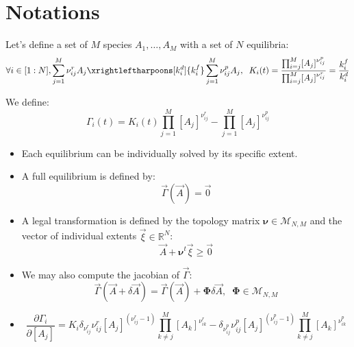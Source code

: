 \documentclass[aps,onecolumn,11pt]{revtex4}
\begin{document}

\section{Notations}

Let's define a set of $M$ species $A_1,\ldots,A_M$ with a set of $N$ equilibria:
\begin{equation}
	\forall i\in[1:N], \sum_{j=1}^M \nu_{ij}^r A_j \xrightleftharpoons[k^d_i]{k^f_i} \sum_{j=1}^{M} \nu_{ij}^p A_j, 
	\;\; K_i(t) = \dfrac{\prod_{i=j}^M [A_j]^{\nu^p_{ij}}}{\prod_{i=j}^M [A_j]^{\nu^r_{ij}}} = \dfrac{k^f_i}{k^d_i}
\end{equation}

We define:
\begin{equation}
	\Gamma_i(t) = K_i(t) \prod_{j=1}^M [A_j]^{\nu^r_{ij}} - \prod_{j=1}^M [A_j]^{\nu^p_{ij}}
\end{equation}

\begin{itemize}
\item Each equilibrium can be individually solved by its specific extent.

\item A full equilibrium is defined by:
\begin{equation}
	\vec{\Gamma}(\vec{A}) = \vec{0}
\end{equation}

\item A legal transformation is defined by the topology matrix $\bm{\nu} \in \mathcal{M}_{N,M}$ 
and the vector of individual extents $\vec{\xi} \in \mathbb{R}^N$:
\begin{equation}
	\vec{A} + \bm{\nu}^t \vec{\xi}  \geq \vec{0}
\end{equation}

\item
We may also compute the jacobian of $\vec{\Gamma}$:
\begin{equation}
	\vec{\Gamma}(\vec{A}+\delta\vec{A}) = \vec{\Gamma}(\vec{A}) + \bm{\Phi} \delta\vec{A}, \;\; \bm{\Phi} \in \mathcal{M}_{N,M}
\end{equation}

\item
\begin{equation}
	\dfrac{\partial \Gamma_i}{\partial [A_j]} 
	= K_i \delta_{\nu^r_{ij} } \nu^r_{ij} [A_j]^{(\nu^r_{ij}-1)} \prod_{k\not=j}^M [A_k]^{\nu^r_{ik}}
	- \delta_{\nu^p_{ij} } \nu^p_{ij} [A_j]^{(\nu^p_{ij}-1)} \prod_{k\not=j}^M [A_k]^{\nu^p_{ik}}
\end{equation}

\end{itemize}
\end{document}
